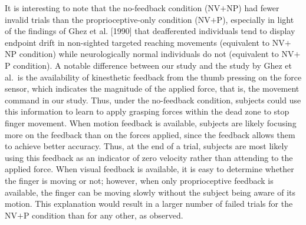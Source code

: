 It is interesting to note that the no-feedback condition (NV$+$NP)
had fewer invalid trials than the proprioceptive-only condition
(NV$+$P), especially in light of the findings of Ghez et al. [1990]
that deafferented individuals tend to display endpoint drift in
non-sighted targeted reaching movements (equivalent to NV$+$NP
condition) while neurologically normal individuals do not (equivalent
to NV$+$P condition). A notable difference between our study and the
study by Ghez et al.\ is the availability of kinesthetic feedback
from the thumb pressing on the force sensor, which indicates the
magnitude of the applied force, that is, the movement command in our
study. Thus, under the no-feedback condition, subjects could use this
information to learn to apply grasping forces within the dead zone to
stop finger movement. When motion feedback is available, subjects are
likely focusing more on the feedback than on the forces applied,
since the feedback allows them to achieve better accuracy. Thus, at
the end of a trial, subjects are most likely using this feedback as
an indicator of zero velocity rather than attending to the applied
force. When visual feedback is available, it is easy to determine
whether the finger is moving or not; however, when only
proprioceptive feedback is available, the finger can be moving slowly
without the subject being aware of its motion. This explanation would
result in a larger number of failed trials for the NV$+$P condition
than for any other, as observed.